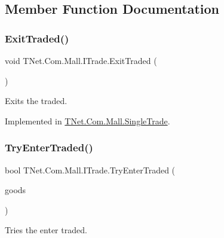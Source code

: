 \subsection{Member Function Documentation}
\mbox{\label{interface_t_net_1_1_com_1_1_mall_1_1_i_trade_acdc77a56a409b403d8bad022031c8bbf}} 
\subsubsection{\texorpdfstring{Exit\+Traded()}{ExitTraded()}}
{\footnotesize\ttfamily void T\+Net.\+Com.\+Mall.\+I\+Trade.\+Exit\+Traded (\begin{DoxyParamCaption}{ }\end{DoxyParamCaption})}



Exits the traded. 



Implemented in \mbox{\hyperlink{class_t_net_1_1_com_1_1_mall_1_1_single_trade_aef46b076d11aa1361f458829d0c58a23}{T\+Net.\+Com.\+Mall.\+Single\+Trade}}.

\mbox{\label{interface_t_net_1_1_com_1_1_mall_1_1_i_trade_a3812ebe5aec424adfe8556739290149a}} 
\subsubsection{\texorpdfstring{Try\+Enter\+Traded()}{TryEnterTraded()}}
{\footnotesize\ttfamily bool T\+Net.\+Com.\+Mall.\+I\+Trade.\+Try\+Enter\+Traded (\begin{DoxyParamCaption}\item[{\mbox{\hyperlink{class_t_net_1_1_com_1_1_model_1_1_goods_data}{Goods\+Data}}}]{goods }\end{DoxyParamCaption})}



Tries the enter traded. 

